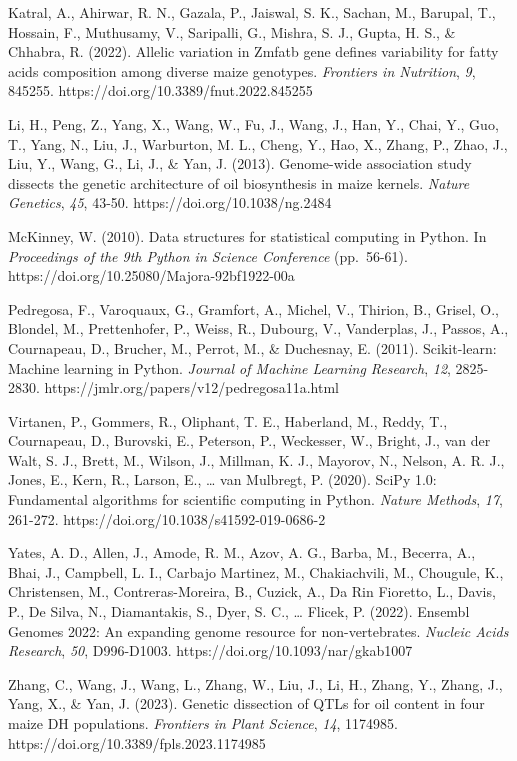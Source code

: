 \documentclass[
]{article}
\begin{document}
Katral, A., Ahirwar, R. N., Gazala, P., Jaiswal, S. K., Sachan, M.,
Barupal, T., Hossain, F., Muthusamy, V., Saripalli, G., Mishra, S. J.,
Gupta, H. S., \& Chhabra, R. (2022). Allelic variation in Zmfatb gene
defines variability for fatty acids composition among diverse maize
genotypes. \emph{Frontiers in Nutrition}, \emph{9}, 845255.
https://doi.org/10.3389/fnut.2022.845255

Li, H., Peng, Z., Yang, X., Wang, W., Fu, J., Wang, J., Han, Y., Chai,
Y., Guo, T., Yang, N., Liu, J., Warburton, M. L., Cheng, Y., Hao, X.,
Zhang, P., Zhao, J., Liu, Y., Wang, G., Li, J., \& Yan, J. (2013).
Genome-wide association study dissects the genetic architecture of oil
biosynthesis in maize kernels. \emph{Nature Genetics}, \emph{45}, 43-50.
https://doi.org/10.1038/ng.2484

McKinney, W. (2010). Data structures for statistical computing in
Python. In \emph{Proceedings of the 9th Python in Science Conference}
(pp.~56-61). https://doi.org/10.25080/Majora-92bf1922-00a

Pedregosa, F., Varoquaux, G., Gramfort, A., Michel, V., Thirion, B.,
Grisel, O., Blondel, M., Prettenhofer, P., Weiss, R., Dubourg, V.,
Vanderplas, J., Passos, A., Cournapeau, D., Brucher, M., Perrot, M., \&
Duchesnay, E. (2011). Scikit-learn: Machine learning in Python.
\emph{Journal of Machine Learning Research}, \emph{12}, 2825-2830.
https://jmlr.org/papers/v12/pedregosa11a.html

Virtanen, P., Gommers, R., Oliphant, T. E., Haberland, M., Reddy, T.,
Cournapeau, D., Burovski, E., Peterson, P., Weckesser, W., Bright, J.,
van der Walt, S. J., Brett, M., Wilson, J., Millman, K. J., Mayorov, N.,
Nelson, A. R. J., Jones, E., Kern, R., Larson, E., \ldots{} van
Mulbregt, P. (2020). SciPy 1.0: Fundamental algorithms for scientific
computing in Python. \emph{Nature Methods}, \emph{17}, 261-272.
https://doi.org/10.1038/s41592-019-0686-2

Yates, A. D., Allen, J., Amode, R. M., Azov, A. G., Barba, M., Becerra,
A., Bhai, J., Campbell, L. I., Carbajo Martinez, M., Chakiachvili, M.,
Chougule, K., Christensen, M., Contreras-Moreira, B., Cuzick, A., Da Rin
Fioretto, L., Davis, P., De Silva, N., Diamantakis, S., Dyer, S. C.,
\ldots{} Flicek, P. (2022). Ensembl Genomes 2022: An expanding genome
resource for non-vertebrates. \emph{Nucleic Acids Research}, \emph{50},
D996-D1003. https://doi.org/10.1093/nar/gkab1007

Zhang, C., Wang, J., Wang, L., Zhang, W., Liu, J., Li, H., Zhang, Y.,
Zhang, J., Yang, X., \& Yan, J. (2023). Genetic dissection of QTLs for
oil content in four maize DH populations. \emph{Frontiers in Plant
Science}, \emph{14}, 1174985. https://doi.org/10.3389/fpls.2023.1174985
\end{document}
